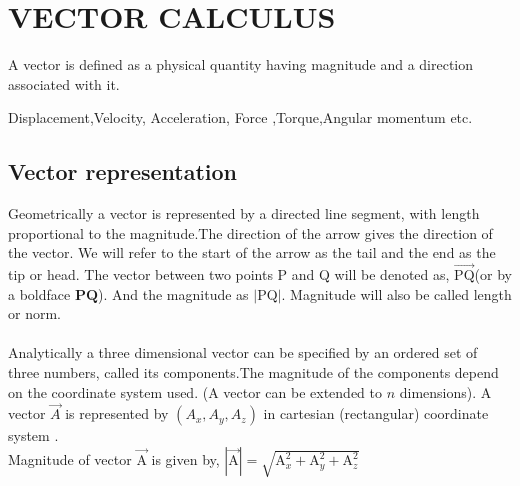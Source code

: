 \chapter{VECTOR CALCULUS}

\begin{definition}
A vector is defined as a physical quantity having magnitude and a direction associated with it. 
\end{definition}
\begin{example}
	 Displacement,Velocity, Acceleration, Force ,Torque,Angular momentum etc. 
\end{example}
\section{Vector representation}
Geometrically  a  vector  is  represented  by  a  directed  line  segment, with length proportional to the magnitude.The direction of the arrow gives the direction of the vector.\newline
We will refer to the start of the arrow as the tail and the end as the tip or head. The vector between two points P and Q  will be denoted as, $\overrightarrow{\mathrm{P Q}}$(or by a boldface $\mathbf{PQ}$). And the  magnitude as $|\mathrm{ PQ}| .$  Magnitude will also be called length or norm.\\\\ Analytically a three  dimensional  vector  can  be  specified  by  an  ordered  set  of  three  numbers,  called  its  components.The magnitude  of  the  components  depend  on  the  coordinate  system  used. (A vector can be extended to $n$ dimensions). A vector $\vec{A}$ is represented by $\left(A_{x}, A_{y}, A_{z}\right)$ in cartesian (rectangular) coordinate system .\\Magnitude of vector $\vec{\mathrm A}$ is given by, $|\vec{\mathrm A}|=\sqrt{\mathrm A_{x}^{2}+\mathrm A_{y}^{2}+\mathrm A_{z}^{2}}$
